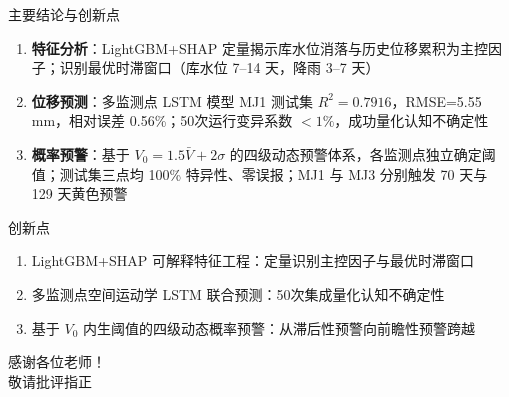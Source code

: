 \documentclass[aspectratio=169,12pt]{beamer}
\begin{document}
\begin{frame}{主要结论与创新点}
  \footnotesize
  \vspace{-0.3em}
  \begin{enumerate}
    \item \textbf{特征分析}：LightGBM+SHAP 定量揭示库水位消落与历史位移累积为主控因子；识别最优时滞窗口（库水位 7--14 天，降雨 3--7 天）
    \item \textbf{位移预测}：多监测点 LSTM 模型 MJ1 测试集 $R^2=0.7916$，RMSE=5.55\,mm，相对误差 0.56\%；50次运行变异系数 $<1\%$，成功量化认知不确定性
    \item \textbf{概率预警}：基于 $V_0 = 1.5\bar V + 2\sigma$ 的四级动态预警体系，各监测点独立确定阈值；测试集三点均 100\% 特异性、零误报；MJ1 与 MJ3 分别触发 70 天与 129 天黄色预警
  \end{enumerate}
  \vspace{-0.2em}
  \begin{alertblock}{创新点}
    \begin{enumerate}
      \item LightGBM+SHAP 可解释特征工程：定量识别主控因子与最优时滞窗口
      \item 多监测点空间运动学 LSTM 联合预测：50次集成量化认知不确定性
      \item 基于 $V_0$ 内生阈值的四级动态概率预警：从滞后性预警向前瞻性预警跨越
    \end{enumerate}
  \end{alertblock}
\end{frame}

\begin{frame}[standout]
  \Huge 感谢各位老师！\\[0.8em]
  \large 敬请批评指正
\end{frame}
\end{document}
